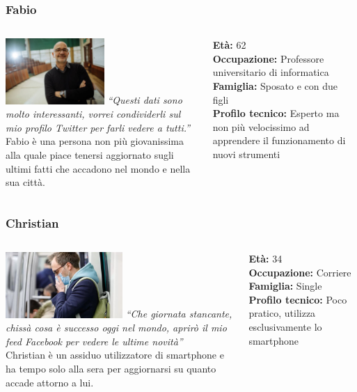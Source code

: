 \documentclass[handout]{beamer}
\begin{document}
		\begin{frame}
			\frametitle{Fabio}
			\begin{columns}[t]
				\begin{column}[T]{6cm}
					\includegraphics[height=2.5cm]{img/fabio}
					\textit{``Questi dati sono molto interessanti, vorrei condividerli sul mio profilo Twitter per farli vedere a tutti.''}\\
					Fabio è una persona non più giovanissima alla quale piace tenersi aggiornato sugli ultimi fatti che accadono nel mondo e nella sua città.
				\end{column}
				\begin{column}[T]{5cm}
					\textbf{Età:} 62\\
					\textbf{Occupazione:} Professore universitario di informatica\\
					\textbf{Famiglia:} Sposato e con due figli\\
					\textbf{Profilo tecnico:} Esperto ma non più velocissimo ad apprendere il funzionamento di nuovi strumenti\\
				\end{column}
			\end{columns}
		\end{frame}

		\begin{frame}
			\frametitle{Christian}
			\begin{columns}[t]
				\begin{column}[T]{6cm}
					\includegraphics[height=2.5cm]{img/christian}
					\textit{``Che giornata stancante, chissà cosa è successo oggi nel mondo, aprirò il mio feed Facebook per vedere le ultime novità''}\\
					Christian è un assiduo utilizzatore di smartphone e  ha tempo solo alla sera per aggiornarsi su quanto accade attorno a lui.
				\end{column}
				\begin{column}[T]{5cm}
					\textbf{Età:} 34\\
					\textbf{Occupazione:} Corriere\\
					\textbf{Famiglia:} Single\\
					\textbf{Profilo tecnico:} Poco pratico, utilizza esclusivamente lo smartphone\\
				\end{column}
			\end{columns}
		\end{frame}
		
\end{document}
